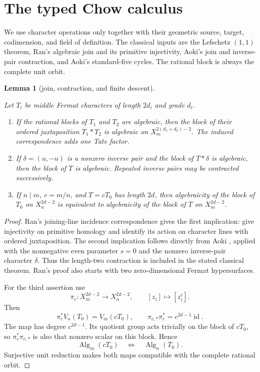 \documentclass[11pt]{amsart}
\numberwithin{theorem}{section}
\newtheorem{lemma}[theorem]{Lemma}
\theoremstyle{remark}
\numberwithin{equation}{section}
\providecommand{\tightlist}{\setlength{\itemsep}{0pt}\setlength{\parskip}{0pt}}
\begin{document}
\section{The typed Chow calculus}\label{sec:3}

We use character operations only together with their geometric source, target,
codimension, and field of definition. The classical inputs are the
Lefschetz \((1,1)\) theorem, Ran's algebraic join and its primitive
injectivity, Aoki's join and inverse-pair contraction, and Aoki's
standard-five cycles. The rational block is always the complete unit orbit.

\begin{lemma}[join, contraction, and finite descent]\label{lemma:3.1}

Let \(T_i\) be middle Fermat characters of length \(2d_i\) and grade \(d_i\).

\begin{enumerate}[label=\arabic*.,leftmargin=*]\tightlist
\item If the rational blocks of \(T_1\) and \(T_2\) are algebraic, then the block
of their ordered juxtaposition \(T_1*T_2\) is algebraic on
\(X_m^{2(d_1+d_2)-2}\). The induced correspondence adds one Tate factor.
\item If \(\delta=(u,-u)\) is a nonzero inverse pair and the block of
\(T*\delta\) is algebraic, then the block of \(T\) is algebraic. Repeated
inverse pairs may be contracted successively.
\item If \(n\mid m\), \(c=m/n\), and \(T=cT_0\) has length \(2d\), then
algebraicity of the block of \(T_0\) on \(X_n^{2d-2}\) is equivalent
to algebraicity of the block of \(T\) on \(X_m^{2d-2}\).
\end{enumerate}

\end{lemma}
\begin{proof}

Ran's joining-line incidence correspondence gives the first implication:
\cite[Proposition 4.6 and Corollary 4.7, p.~140]{ran1980} give injectivity on primitive
homology and identify its action on character lines with ordered
juxtaposition. The second implication follows directly from Aoki
\cite[Theorem 1-4(ii), p.~388]{aoki1987}, applied with the nonnegative even parameter
\(s=0\) and the nonzero inverse-pair character \(\delta\). Thus the
length-two contraction is included in the stated classical theorem.
Ran's proof also starts with two zero-dimensional Fermat hypersurfaces.

For the third assertion use
\[
\pi_c\colon X_m^{2d-2}\longrightarrow X_n^{2d-2},
\qquad [z_i]\longmapsto[z_i^c].
\]
Then
\[
\pi_c^*V_n(T_0)=V_m(cT_0),
\qquad \pi_{c,*}\pi_c^*=c^{2d-1}\operatorname{id}.
\]
The map has degree \(c^{2d-1}\). Its quotient group acts trivially on
the block of \(cT_0\), so \(\pi_c^*\pi_{c,*}\) is also that nonzero
scalar on this block. Hence
\[
\operatorname{Alg}_m(cT_0)\quad\Longleftrightarrow\quad
\operatorname{Alg}_n(T_0).
\tag{2}\label{eq:2}
\]
Surjective unit reduction makes both maps compatible with the complete
rational orbit.
\end{proof}
\end{document}
